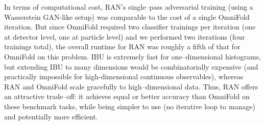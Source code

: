             In terms of computational cost, RAN’s single--pass adversarial training (using a Wasserstein GAN-like setup) was comparable to the cost of a single OmniFold iteration.
            But since OmniFold required two classifier trainings per iteration (one at detector level, one at particle level) and we performed two iterations (four trainings total), the overall runtime for RAN was roughly a fifth of that for OmniFold on this problem.
            IBU is extremely fast for one--dimensional histograms, but extending IBU to many dimensions would be combinatorially expensive (and practically impossible for high-dimensional continuous observables), whereas RAN and OmniFold scale gracefully to high--dimensional data.
            Thus, RAN offers an attractive trade--off: it achieves equal or better accuracy than OmniFold on these benchmark tasks, while being simpler to use (no iterative loop to manage) and potentially more efficient.

